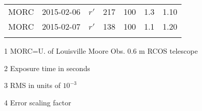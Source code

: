 \begin{center}
\begin{table*}[!ht]
\begin{threeparttable}
\begin{tabular}{ccccccc}
MORC & 2015-02-06 & $r'$ & 217 & 100 & 1.3 & 1.10\\
MORC & 2015-02-07 & $r'$ & 138 & 100 & 1.1 & 1.20\\
&&&&\\
\hline
\end{tabular}
\begin{tablenotes}
\item [1]MORC=U. of Louisville Moore Obs. 0.6 m RCOS telescope\\
\item [2]Exposure time in seconds\\
\item [3]RMS in units of $10^{-3}$\\
\item [4]Error scaling factor
\end{tablenotes}
\end{threeparttable}
\end{table*}
\end{center}